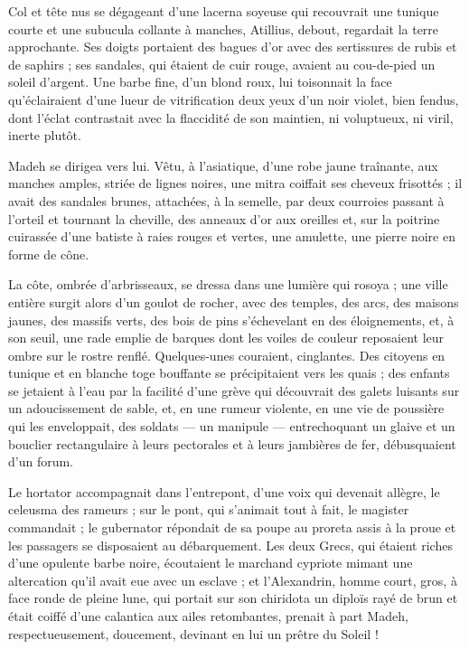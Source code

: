 \documentclass[a4paper, 11pt, oneside, polutonikogreek, french]{article}
\begin{document}
Col et tête nus se dégageant d'une lacerna soyeuse qui recouvrait une tunique courte et une subucula collante à manches, Atillius, debout, regardait la terre approchante. Ses doigts portaient des bagues d'or avec des sertissures de rubis et de saphirs ; ses sandales, qui étaient de cuir rouge, avaient au cou-de-pied un soleil d'argent. Une barbe fine, d'un blond roux, lui toisonnait la face qu'éclairaient d'une lueur de vitrification deux yeux d'un noir violet, bien fendus, dont l'éclat contrastait avec la flaccidité de son maintien, ni voluptueux, ni viril, inerte plutôt.

Madeh se dirigea vers lui. Vêtu, à l'asiatique, d'une robe jaune traînante, aux manches amples, striée de lignes noires, une mitra coiffait ses cheveux frisottés ; il avait des sandales brunes, attachées, à la semelle, par deux courroies passant à l'orteil et tournant la cheville, des anneaux d'or aux oreilles et, sur la poitrine cuirassée d'une batiste à raies rouges et vertes, une amulette, une pierre noire en forme de cône.

La côte, ombrée d'arbrisseaux, se dressa dans une lumière qui rosoya ; une ville entière surgit alors d'un goulot de rocher, avec des temples, des arcs, des maisons jaunes, des massifs verts, des bois de pins s'échevelant en des éloignements, et, à son seuil, une rade emplie de barques dont les voiles de couleur reposaient leur ombre sur le rostre renflé. Quelques-unes couraient, cinglantes. Des citoyens en tunique et en blanche toge bouffante se précipitaient vers les quais ; des enfants se jetaient à l'eau par la facilité d'une grève qui découvrait des galets luisants sur un adoucissement de sable, et, en une rumeur violente, en une vie de poussière qui les enveloppait, des soldats --- un manipule --- entrechoquant un glaive et un bouclier rectangulaire à leurs pectorales et à leurs jambières de fer, débusquaient d'un forum.

Le hortator accompagnait dans l'entrepont, d'une voix qui devenait allègre, le celeusma des rameurs ; sur le pont, qui s'animait tout à fait, le magister commandait ; le gubernator répondait de sa poupe au proreta assis à la proue et les passagers se disposaient au débarquement. Les deux Grecs, qui étaient riches d'une opulente barbe noire, écoutaient le marchand cypriote mimant une altercation qu'il avait eue avec un esclave ; et l'Alexandrin, homme court, gros, à face ronde de pleine lune, qui portait sur son chiridota un diploïs rayé de brun et était coiffé d'une calantica aux ailes retombantes, prenait à part Madeh, respectueusement, doucement, devinant en lui un prêtre du Soleil !
\end{document}

